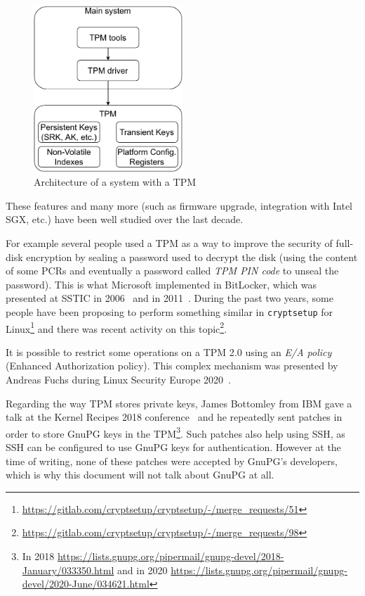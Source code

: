 \begin{figure}[ht]
  \centering
  \includegraphics[width=0.5\textwidth]{ProtectingSshAuthenticationWithTpm20/img/tpm.pdf}
  \caption{Architecture of a system with a TPM}
  \label{fig:protectingsshauthenticationwithtpm20:tpmarchi}
\end{figure}

These features and many more (such as firmware upgrade, integration with
Intel SGX, etc.) have been well studied over the last decade.

For example several people used a TPM as a way to improve the security
of full-disk encryption by sealing a password used to decrypt the disk
(using the content of some PCRs and eventually a password called
\emph{TPM PIN code} to unseal the password). This is what Microsoft
implemented in BitLocker, which was presented at SSTIC in
2006~\cite{protectingsshauthenticationwithtpm20:sstic2006ourghanlian} and
in 2011~\cite{protectingsshauthenticationwithtpm20:sstic2011bordes}.
During the past two years, some people have been proposing to perform
something similar in \texttt{cryptsetup} for
Linux\footnote{\url{https://gitlab.com/cryptsetup/cryptsetup/-/merge_requests/51}}
and there was recent activity on this topic\footnote{\url{https://gitlab.com/cryptsetup/cryptsetup/-/merge_requests/98}}.

It is possible to restrict some operations on a TPM 2.0 using an
\emph{E/A policy} (Enhanced Authorization policy). This complex
mechanism was presented by Andreas Fuchs during Linux Security Europe
2020~\cite{protectingsshauthenticationwithtpm20:linseceu2020}.

Regarding the way TPM stores private keys, James Bottomley from IBM gave
a talk at the Kernel Recipes 2018
conference~\cite{protectingsshauthenticationwithtpm20:kernelrecipes2018}
and he repeatedly sent patches in order to store GnuPG keys in the
TPM\footnote{In 2018
  \url{https://lists.gnupg.org/pipermail/gnupg-devel/2018-January/033350.html}
  and in 2020
  \url{https://lists.gnupg.org/pipermail/gnupg-devel/2020-June/034621.html}}.
Such patches also help using SSH, as SSH can be configured to use GnuPG
keys for authentication. However at the time of writing, none of these
patches were accepted by GnuPG's developers, which is why this document
will not talk about GnuPG at all.


